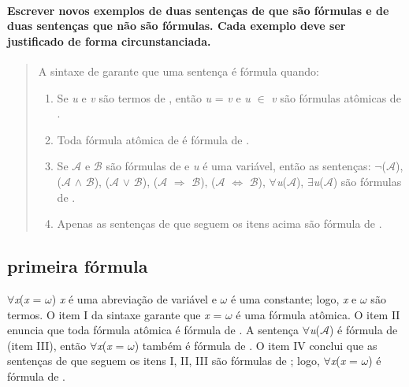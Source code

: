 
\paragraph{Escrever novos exemplos de duas sentenças de  que são fórmulas e de duas sentenças que	não são fórmulas. Cada exemplo deve ser justificado de forma circunstanciada.}
\begin{quote}
	A sintaxe de  garante que uma sentença é fórmula quando:
	\begin{enumerate}[label=\roman*., itemsep=0pt, topsep=0pt]
		\item Se \textit{u} e \textit{v} são termos de , então \textit{u} = \textit{v}
		e \textit{u} $\in$ \textit{v} são fórmulas atômicas de .
		\item Toda fórmula atômica de  é fórmula de .
		\item Se $\mathcal{A}$ e $\mathcal{B}$ são fórmulas de  e \textit{u} é uma variável, então as sentenças: $\lnot$($\mathcal{A}$), ($\mathcal{A}$ $\land$ $\mathcal{B}$), ($\mathcal{A}$ $\lor$ $\mathcal{B}$), \newline($\mathcal{A}$ $\Rightarrow$ $\mathcal{B}$), ($\mathcal{A}$ $\Leftrightarrow$ $\mathcal{B}$), $\forall$\textit{u}($\mathcal{A}$), $\exists$\textit{u}($\mathcal{A}$) são fórmulas de .
		\item Apenas as sentenças de  que seguem os itens acima são fórmula de .
	\end{enumerate}
\end{quote}

\subsection{primeira fórmula}
$\forall$\textit{x}(\textit{x} = $\omega$)
\newline
\textit{x} é uma abreviação de variável e $\omega$ é uma constante; logo, \textit{x} e $\omega$ são termos. O item I da sintaxe 
garante que \textit{x} = $\omega$ é uma fórmula atômica. O item II enuncia que toda fórmula atômica é fórmula de .
A sentença $\forall$\textit{u}($\mathcal{A}$) é fórmula de (item III), então $\forall$\textit{x}(\textit{x} = $\omega$) também é fórmula de . O item IV conclui que as sentenças de  que seguem os itens I, II, III são fórmulas de ; logo,
$\forall$\textit{x}(\textit{x} = $\omega$) é fórmula de .

